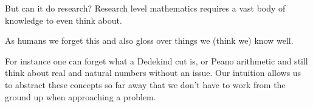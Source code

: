 {\begin{frame}{But can it do research?}
    Research level mathematics requires a vast body of knowledge to even think about.
    \pause

    As humans we forget this and also gloss over things we (think we) know well.
    \pause

    For instance one can forget what a Dedekind cut is, or Peano arithmetic and still think about real and natural numbers without an issue.
    Our intuition allows us to abstract these concepts so far away that we don't have to work from the ground up when approaching a problem.

\end{frame}}


